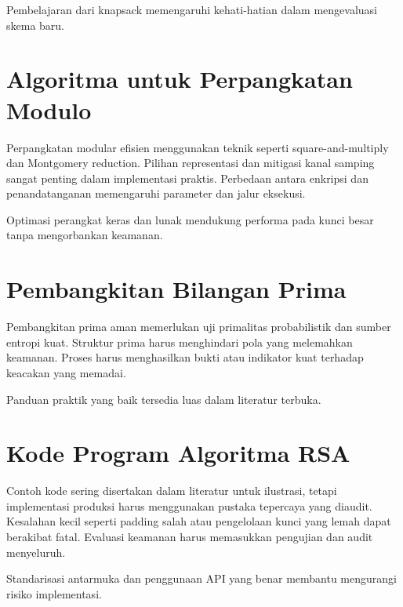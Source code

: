 \documentclass[../main.tex]{subfiles}
\begin{document}
Pembelajaran dari knapsack memengaruhi kehati-hatian dalam mengevaluasi skema baru.

\section{Algoritma untuk Perpangkatan Modulo}
Perpangkatan modular efisien menggunakan teknik seperti square-and-multiply dan Montgomery reduction. Pilihan representasi dan mitigasi kanal samping sangat penting dalam implementasi praktis. Perbedaan antara enkripsi dan penandatanganan memengaruhi parameter dan jalur eksekusi.

Optimasi perangkat keras dan lunak mendukung performa pada kunci besar tanpa mengorbankan keamanan.

\section{Pembangkitan Bilangan Prima}
Pembangkitan prima aman memerlukan uji primalitas probabilistik dan sumber entropi kuat. Struktur prima harus menghindari pola yang melemahkan keamanan. Proses harus menghasilkan bukti atau indikator kuat terhadap keacakan yang memadai.

Panduan praktik yang baik tersedia luas dalam literatur terbuka.

\section{Kode Program Algoritma RSA}
Contoh kode sering disertakan dalam literatur untuk ilustrasi, tetapi implementasi produksi harus menggunakan pustaka tepercaya yang diaudit. Kesalahan kecil seperti padding salah atau pengelolaan kunci yang lemah dapat berakibat fatal. Evaluasi keamanan harus memasukkan pengujian dan audit menyeluruh.

Standarisasi antarmuka dan penggunaan API yang benar membantu mengurangi risiko implementasi.
\end{document}
